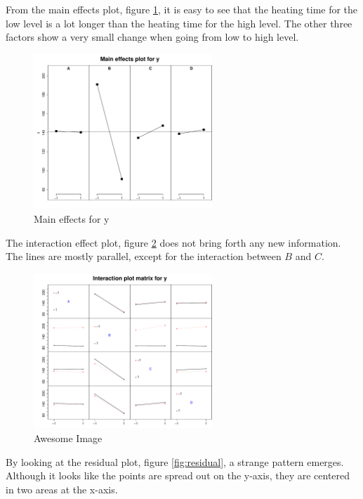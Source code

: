 From the main effects plot, figure \ref{fig:mainEff}, it is easy to see that the heating time for the low level is a lot longer than the heating time for the high level. The other three factors show a very small change when going from low to high level.

\begin{figure}[H]
    \centering
    \includegraphics[width=0.6\textwidth]{PDF/mainEffects4factors.pdf}
    \caption{Main effects for y}
    \label{fig:mainEff}
\end{figure}

The interaction effect plot, figure \ref{fig:interaction} does not bring forth any new information. The lines are mostly parallel, except  for the interaction between $B$ and $C$.

\begin{figure}[H]
    \centering
    \includegraphics[width=0.6\textwidth]{PDF/interactionPlot4factors.pdf}
    \caption{Awesome Image}
    \label{fig:interaction}
\end{figure}

By looking at the residual plot, figure \ref{fig:residual}, a strange pattern emerges. Although it looks like the points are spread out on the y-axis, they are centered in two areas at the x-axis.

